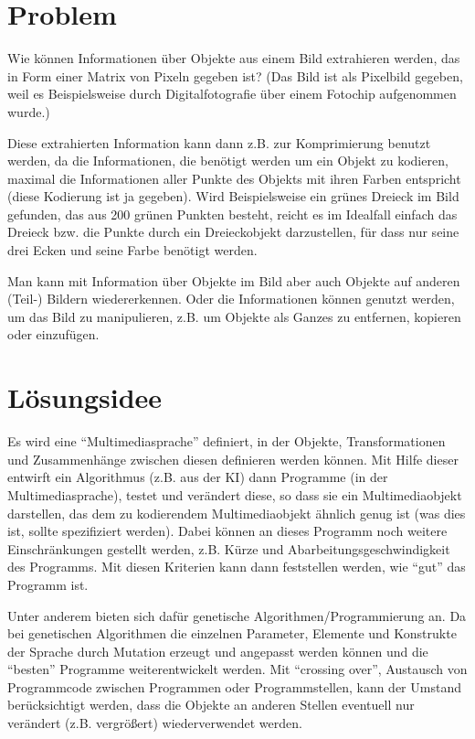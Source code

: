 \documentclass[11pt,a4paper]{article}
\begin{document}
\section{Problem}
\label{secProblem}

Wie können Informationen über Objekte aus einem Bild extrahieren werden, das in Form einer Matrix von Pixeln gegeben ist? (Das Bild ist als Pixelbild gegeben, weil es Beispielsweise durch Digitalfotografie über einem Fotochip aufgenommen wurde.)

Diese extrahierten Information kann dann z.B. zur Komprimierung benutzt werden, da die Informationen, die benötigt werden um ein Objekt zu kodieren, maximal die Informationen aller Punkte des Objekts mit ihren Farben entspricht (diese Kodierung ist ja gegeben). Wird Beispielsweise ein grünes Dreieck im Bild gefunden, das aus 200 grünen Punkten besteht, reicht es im Idealfall einfach das Dreieck bzw. die Punkte durch ein Dreieckobjekt darzustellen, für dass nur seine drei Ecken und seine Farbe benötigt werden.

Man kann mit Information über Objekte im Bild aber auch Objekte auf anderen (Teil-) Bildern wiedererkennen. Oder die Informationen können genutzt werden, um das Bild zu manipulieren, z.B. um Objekte als Ganzes zu entfernen, kopieren oder einzufügen.


\section{Lösungsidee}
\label{secSolution}

Es wird eine ``Multimediasprache'' definiert, in der Objekte, Transformationen und Zusammenhänge zwischen diesen definieren werden können. Mit Hilfe dieser entwirft ein Algorithmus (z.B. aus der KI) dann Programme (in der Multimediasprache), testet und verändert diese, so dass sie ein Multimediaobjekt darstellen, das dem zu kodierendem Multimediaobjekt ähnlich genug ist (was dies ist, sollte spezifiziert werden). Dabei können an dieses Programm noch weitere Einschränkungen gestellt werden, z.B. Kürze und Abarbeitungsgeschwindigkeit des Programms. Mit diesen Kriterien kann dann feststellen werden, wie ``gut'' das Programm ist.

Unter anderem bieten sich dafür genetische Algorithmen/Programmierung an. Da bei genetischen Algorithmen die einzelnen Parameter, Elemente und Konstrukte der Sprache durch Mutation erzeugt und angepasst werden können und die ``besten'' Programme weiterentwickelt werden. Mit ``crossing over'', Austausch von Programmcode zwischen Programmen oder Programmstellen, kann der Umstand berücksichtigt werden, dass die Objekte an anderen Stellen eventuell nur verändert (z.B. vergrößert) wiederverwendet werden.
\end{document}
